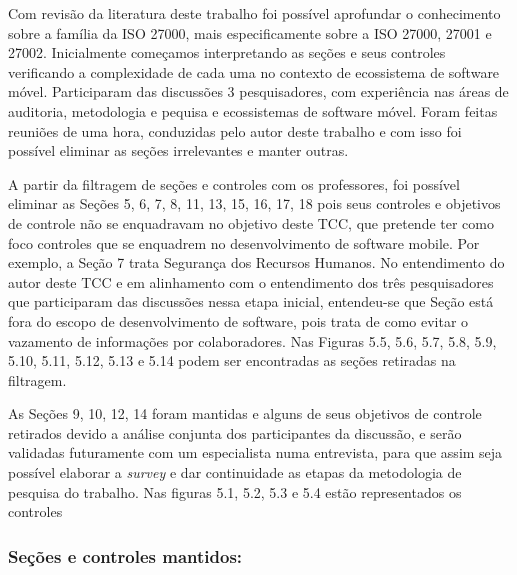  Com revisão da literatura deste trabalho foi possível aprofundar o conhecimento sobre a família da ISO 27000, mais especificamente sobre a ISO 27000, 27001 e 27002. Inicialmente começamos interpretando as seções e seus controles verificando a complexidade de cada uma no contexto de ecossistema de software móvel. Participaram das discussões 3 pesquisadores, com experiência nas áreas de auditoria,  metodologia e pequisa e ecossistemas de software móvel. Foram feitas reuniões de uma hora, conduzidas pelo autor deste trabalho e com isso foi possível eliminar as seções irrelevantes e manter outras.

 
 
 A partir da filtragem de seções e controles com os professores, foi possível eliminar as Seções 5, 6, 7, 8, 11, 13, 15, 16, 17, 18 pois seus controles e objetivos de controle não se enquadravam no objetivo deste TCC, que  pretende ter como foco controles que se enquadrem no desenvolvimento de software mobile. Por exemplo, a Seção 7 trata Segurança dos Recursos Humanos. No entendimento do autor deste TCC e em alinhamento com o entendimento dos três pesquisadores que participaram das discussões nessa etapa inicial, entendeu-se que Seção está fora do escopo de desenvolvimento de software, pois trata de como evitar o vazamento de informações por colaboradores. Nas Figuras 5.5, 5.6, 5.7, 5.8, 5.9, 5.10, 5.11, 5.12, 5.13 e 5.14 podem ser encontradas as seções retiradas na filtragem. 
 
 As Seções 9, 10, 12, 14 foram mantidas e alguns de seus objetivos de controle retirados devido a análise conjunta dos participantes da discussão, e serão validadas futuramente com um especialista numa entrevista, para que assim seja possível elaborar a \textit{survey} e dar continuidade as etapas da metodologia de pesquisa do trabalho.  Nas figuras 5.1, 5.2, 5.3 e 5.4 estão representados os controles 
 
\subsubsection{Seções e controles mantidos:}
 
